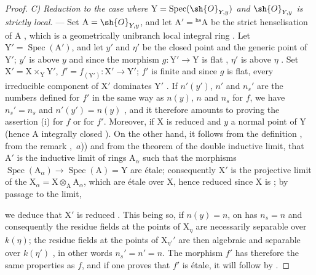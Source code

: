 \begin{proof}
\emph{C) Reduction to the case where $\mathrm{Y}=\operatorname{Spec}(\sh{O}_{Y,y})$ and $\sh{O}_{Y,y}$ is strictly local.} ---
Set $\mathrm{A}=\sh{O}_{Y,y}$, and let $\mathrm{A}'={}^{\mathrm{hs}}\mathrm{A}$ be the strict henselisation of $\mathrm{A}$ , which is a geometrically unibranch local integral ring .
Let $\mathrm{Y}'=\operatorname{Spec}(\mathrm{A}')$, and let $y'$ and $\eta'$ be the closed point and the generic point of $\mathrm{Y}'$; $y'$ is above $y$ and since the morphism $g:\mathrm{Y}'\to\mathrm{Y}$ is flat , $\eta'$ is above $\eta$ .
Set $\mathrm{X}'=\mathrm{X}\times_{\mathrm{Y}}\mathrm{Y}'$, $f'=f_{(\mathrm{Y}')}:\mathrm{X}'\to\mathrm{Y}'$; $f'$ is finite and since $g$ is flat, every irreducible component of $\mathrm{X}'$ dominates $\mathrm{Y}'$ .
If $n'(y')$, $n'$ and $n_s'$ are the numbers defined for $f'$ in the same way as $n(y)$, $n$ and $n_s$ for $f$, we have $n_s'=n_s$ and $n'(y')=n(y)$ , and it therefore amounts to proving the assertion (i) for $f$ or for $f'$.
Moreover, if $\mathrm{X}$ is reduced and $y$ a normal point of $\mathrm{Y}$ (hence $\mathrm{A}$ integrally closed ).
On the other hand, it follows from the definition , from the remark ,~$a$)) and from the theorem of the double inductive limit, that $\mathrm{A}'$ is the inductive limit of rings $\mathrm{A}_\alpha$ such that the morphisms $\operatorname{Spec}(\mathrm{A}_\alpha)\to\operatorname{Spec}(\mathrm{A})=\mathrm{Y}$ are \'etale; consequently $\mathrm{X}'$ is the projective limit of the $\mathrm{X}_\alpha=\mathrm{X}\otimes_{\mathrm{A}}\mathrm{A}_\alpha$, which are \'etale over $\mathrm{X}$, hence reduced since $\mathrm{X}$ is ; by passage to the limit,


we deduce that $\mathrm{X}'$ is reduced .
This being so, if $n(y)=n$, on has $n_s=n$ and consequently the residue fields at the points of $\mathrm{X}_\eta$ are necessarily separable over $k(\eta)$; the residue fields at the points of $\mathrm{X}_{\eta'}'$ are then algebraic and separable over $k(\eta')$ , in other words $n_s'=n'=n$.
The morphism $f'$ has therefore the same properties as $f$, and if one proves that $f'$ is \'etale, it will follow by .


\end{proof}
